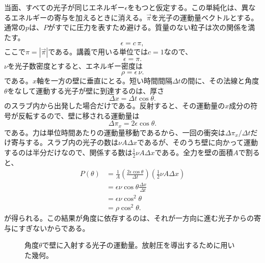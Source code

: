 当面、すべての光子が同じエネルギー\(\epsilon\)をもつと仮定する。この単純化は、異なるエネルギーの寄与を加えるときに消える。\(\vec{\pi}\)を光子の運動量ベクトルとする。通常の\(p\)は、\(P\)がすでに圧力を表すため避ける。質量のない粒子は次の関係を満たす。
\begin{equation}
\epsilon=c\,\pi,
\end{equation}
ここで\(\pi=|\vec{\pi}|\)である。講義で用いる単位では\(c=1\)なので、
\begin{equation}
\epsilon=\pi.
\end{equation}
\(\nu\)を光子数密度とすると、エネルギー密度は
\begin{equation}
\rho=\epsilon\,\nu.
\end{equation}
である。\(x\)軸を一方の壁に垂直にとる。短い時間間隔\(\Delta t\)の間に、その法線と角度\(\theta\)をなして運動する光子が壁に到達するのは、厚さ
\begin{equation}
\Delta x=\Delta t\cos\theta.
\end{equation}
のスラブ内から出発した場合だけである。反射すると、その運動量の\(x\)成分の符号が反転するので、壁に移される運動量は
\begin{equation}
\Delta \pi_x=2\epsilon\cos\theta.
\end{equation}
である。力は単位時間あたりの運動量移動であるから、一回の衝突は\(\Delta \pi_x/\Delta t\)だけ寄与する。スラブ内の光子の数は\(\nu A\Delta x\)であるが、そのうち壁に向かって運動するのは半分だけなので、関係する数は\(\tfrac12 \nu A\Delta x\)である。全力を壁の面積\(A\)で割ると、
\begin{align}
P(\theta)
&=
\frac{1}{A}
\left(\frac{2\epsilon\cos\theta}{\Delta t}\right)
\left(\frac12 \nu A\Delta x\right) \\
&=
\epsilon\nu\cos\theta\frac{\Delta x}{\Delta t} \\
&=
\epsilon\nu\cos^2\theta \\
&=
\rho\cos^2\theta.
\end{align}
が得られる。この結果が角度に依存するのは、それが一方向に進む光子からの寄与にすぎないからである。

\begin{figure}[htbp]
\centering
{}
\caption{角度\(\theta\)で壁に入射する光子の運動量。放射圧を導出するために用いた幾何。}
\label{fig:c05-photon-pressure}
\end{figure}

